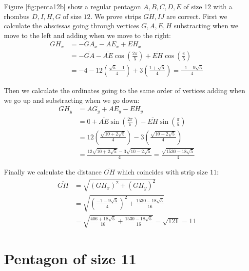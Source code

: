 \documentclass[11pt]{article}
\begin{document}
Figure \ref{fig:penta12b} show a regular pentagon $A,B,C,D,E$ of size 12 with a rhombus $D,I,H,G$ of size $12$. We prove strips $GH,IJ$ are correct. First we calculate the abscissas going through vertices $G,A,E,H$ substracting when we move to the left and adding when we move to the right:
\begin{align}
GH_x &= -GA_x - AE_x + EH_x\\
 &= -\overline{GA} - \overline{AE}\cos\left(\frac{2\pi}5\right)
 +\overline{EH}\cos\left(\frac{\pi}5\right)\nonumber\\
 &= -4 - 12\left(\frac{\sqrt5 - 1}4\right) + 3\left(\frac{1+\sqrt5}4\right)
 = \frac{-1-9\sqrt5}4
\end{align}

Then we calculate the ordinates going to the same order of vertices adding when we go up and substracting when we go down:
\begin{align}
GH_y &= AG_y + AE_y - EH_y\\
 &= 0 + \overline{AE}\sin\left(\frac{2\pi}5\right)
 - \overline{EH}\sin\left(\frac{\pi}5\right)\nonumber\\
 &= 12\left(\frac{\sqrt{10+2\sqrt5}}4\right)
 - 3\left(\frac{\sqrt{10-2\sqrt5}}4\right)\nonumber\\
 &= \frac{12\sqrt{10+2\sqrt5} -3\sqrt{10-2\sqrt5}}4 = \frac{\sqrt{1530-18\sqrt5}}4
\end{align}

Finally we calculate the distance $\overline{GH}$ which coincides with strip size $11$:
\begin{align}
\overline{GH} &= \sqrt{(GH_x)^2 + (GH_y)^2}\\
 &= \sqrt{\left(\frac{-1-9\sqrt5}{4}\right)^2 + \frac{1530-18\sqrt5}{16}}\nonumber\\
 &= \sqrt{\frac{406+18\sqrt5}{16} + \frac{1530-18\sqrt5}{16}} = \sqrt{121} = 11
\end{align}


\section{Pentagon of size 11}
\end{document}
